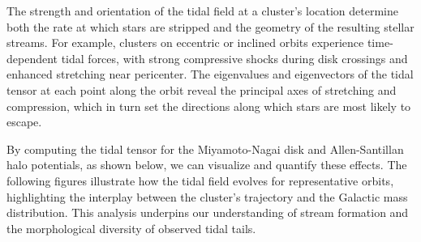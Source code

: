             The strength and orientation of the tidal field at a cluster's location determine both the rate at which stars are stripped and the geometry of the resulting stellar streams. For example, clusters on eccentric or inclined orbits experience time-dependent tidal forces, with strong compressive shocks during disk crossings and enhanced stretching near pericenter. The eigenvalues and eigenvectors of the tidal tensor at each point along the orbit reveal the principal axes of stretching and compression, which in turn set the directions along which stars are most likely to escape.

            By computing the tidal tensor for the Miyamoto-Nagai disk and Allen-Santillan halo potentials, as shown below, we can visualize and quantify these effects. The following figures illustrate how the tidal field evolves for representative orbits, highlighting the interplay between the cluster's trajectory and the Galactic mass distribution. This analysis underpins our understanding of stream formation and the morphological diversity of observed tidal tails.

